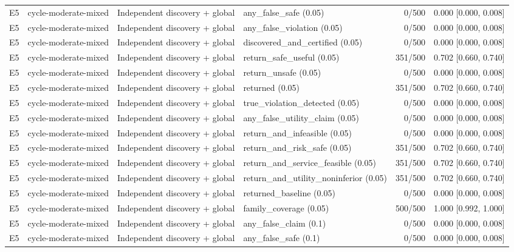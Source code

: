 \begin{longtable}{p{.04\linewidth}p{.18\linewidth}p{.19\linewidth}p{.16\linewidth}r p{.21\linewidth}}
E5 & cycle-moderate-mixed & Independent discovery + global & any\_false\_safe (0.05) & 0/500 & 0.000 [0.000, 0.008]\\
E5 & cycle-moderate-mixed & Independent discovery + global & any\_false\_violation (0.05) & 0/500 & 0.000 [0.000, 0.008]\\
E5 & cycle-moderate-mixed & Independent discovery + global & discovered\_and\_certified (0.05) & 0/500 & 0.000 [0.000, 0.008]\\
E5 & cycle-moderate-mixed & Independent discovery + global & return\_safe\_useful (0.05) & 351/500 & 0.702 [0.660, 0.740]\\
E5 & cycle-moderate-mixed & Independent discovery + global & return\_unsafe (0.05) & 0/500 & 0.000 [0.000, 0.008]\\
E5 & cycle-moderate-mixed & Independent discovery + global & returned (0.05) & 351/500 & 0.702 [0.660, 0.740]\\
E5 & cycle-moderate-mixed & Independent discovery + global & true\_violation\_detected (0.05) & 0/500 & 0.000 [0.000, 0.008]\\
E5 & cycle-moderate-mixed & Independent discovery + global & any\_false\_utility\_claim (0.05) & 0/500 & 0.000 [0.000, 0.008]\\
E5 & cycle-moderate-mixed & Independent discovery + global & return\_and\_infeasible (0.05) & 0/500 & 0.000 [0.000, 0.008]\\
E5 & cycle-moderate-mixed & Independent discovery + global & return\_and\_risk\_safe (0.05) & 351/500 & 0.702 [0.660, 0.740]\\
E5 & cycle-moderate-mixed & Independent discovery + global & return\_and\_service\_feasible (0.05) & 351/500 & 0.702 [0.660, 0.740]\\
E5 & cycle-moderate-mixed & Independent discovery + global & return\_and\_utility\_noninferior (0.05) & 351/500 & 0.702 [0.660, 0.740]\\
E5 & cycle-moderate-mixed & Independent discovery + global & returned\_baseline (0.05) & 0/500 & 0.000 [0.000, 0.008]\\
E5 & cycle-moderate-mixed & Independent discovery + global & family\_coverage (0.05) & 500/500 & 1.000 [0.992, 1.000]\\
E5 & cycle-moderate-mixed & Independent discovery + global & any\_false\_claim (0.1) & 0/500 & 0.000 [0.000, 0.008]\\
E5 & cycle-moderate-mixed & Independent discovery + global & any\_false\_safe (0.1) & 0/500 & 0.000 [0.000, 0.008]\\

\end{longtable}
